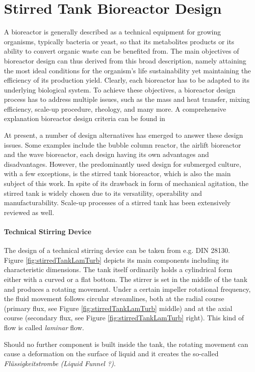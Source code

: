 \section{Stirred Tank Bioreactor Design}

A bioreactor is generally described as a technical equipment for growing organisms, typically bacteria or yeast, so that its metabolites products or its ability to convert organic waste can be benefited from. The main objectives of bioreactor design can thus derived from this broad description, namely attaining the most ideal conditions for the organism's life sustainability yet maintaining the efficiency of its production yield. Clearly, each bioreactor has to be adapted to its underlying biological system. To achieve these objectives, a bioreactor design process has to address multiple issues, such as the mass and heat transfer, mixing efficiency, scale-up procedure, rheology, and many more. A comprehensive explanation bioreactor design criteria can be found in \citet{Mandenius2016}

At present, a number of design alternatives has emerged to answer these design issues. Some examples include the bubble column reactor, the airlift bioreactor and the wave bioreactor, each design having its own advantages and disadvantages. However, the predominantly used design for submerged culture, with a few exceptions, is the stirred tank bioreactor, which is also the main subject of this work. In spite of its drawback in form of mechanical agitation, the stirred tank is widely chosen due to its versatility, operability and manufacturability. Scale-up processes of a stirred tank has been extensively reviewed as well.


\paragraph{Technical Stirring Device}
The design of a technical stirring device can be taken from e.g. DIN 28130. Figure \ref{fig:stirredTankLamTurb} depicts its main components including its characteristic dimensions. The tank itself ordinarily holds a cylindrical form either with a curved or a flat bottom. The stirrer is set in the middle of the tank and produces a rotating movement. Under a certain impeller rotational frequency, the fluid movement follows circular streamlines, both at the radial course (primary flux, see Figure \ref{fig:stirredTankLamTurb} middle) and at the axial course (secondary flux, see Figure \ref{fig:stirredTankLamTurb} right). This kind of flow is called \textit{laminar} flow.

Should no further component is built inside the tank, the rotating movement can cause a deformation on the surface of liquid and it creates the so-called \textit{Fl\"ussigkeitstrombe (Liquid Funnel ?)}.